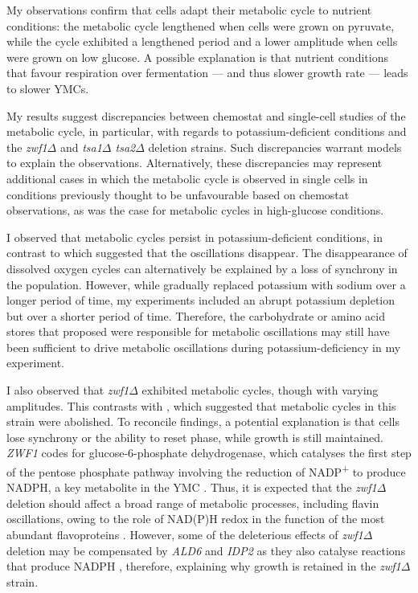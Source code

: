 My observations confirm that cells adapt their metabolic cycle to nutrient conditions:
the metabolic cycle lengthened when cells were grown on pyruvate, while the cycle exhibited a lengthened period and a lower amplitude when cells were grown on low glucose.
A possible explanation is that nutrient conditions that favour respiration over fermentation --- and thus slower growth rate --- leads to slower YMCs.

My results suggest discrepancies between chemostat and single-cell studies of the metabolic cycle, in particular, with regards to potassium-deficient conditions and the \textit{zwf1$\Delta$} and \textit{tsa1$\Delta$ tsa2$\Delta$} deletion strains.
Such discrepancies warrant models to explain the observations.
Alternatively, these discrepancies may represent additional cases in which the metabolic cycle is observed in single cells in conditions previously thought to be unfavourable based on chemostat observations, as was the case for metabolic cycles in high-glucose conditions.

I observed that metabolic cycles persist in potassium-deficient conditions, in contrast to \textcite{oneillEukaryoticCellBiology2020} which suggested that the oscillations disappear.
The disappearance of dissolved oxygen cycles can alternatively be explained by a loss of synchrony in the population.
However, while \textcite{oneillEukaryoticCellBiology2020} gradually replaced potassium with sodium over a longer period of time, my experiments included an abrupt potassium depletion but over a shorter period of time.
Therefore, the carbohydrate or amino acid stores that \textcite{oneillEukaryoticCellBiology2020} proposed were responsible for metabolic oscillations may still have been sufficient to drive metabolic oscillations during potassium-deficiency in my experiment.

I also observed that \textit{zwf1$\Delta$} exhibited metabolic cycles, though with varying amplitudes.
This contrasts with \textcite{tuCyclicChangesMetabolic2007}, which suggested that metabolic cycles in this strain were abolished.
To reconcile findings, a potential explanation is that cells lose synchrony or the ability to reset phase, while growth is still maintained.
\textit{ZWF1} codes for glucose-6-phosphate dehydrogenase, which catalyses the first step of the pentose phosphate pathway involving the reduction of NADP\textsuperscript{+} to produce NADPH, a key metabolite in the YMC \parencite{nogaeIsolationCharacterizationZWF11990}.
Thus, it is expected that the \textit{zwf1$\Delta$} deletion should affect a broad range of metabolic processes, including flavin oscillations, owing to the role of NAD(P)H redox in the function of the most abundant flavoproteins \parencite{gudipatiFlavoproteomeYeastSaccharomyces2014}.
However, some of the deleterious effects of \textit{zwf1$\Delta$} deletion may be compensated by \textit{ALD6} and \textit{IDP2} as they also catalyse reactions that produce NADPH \parencite{minardSourcesNADPHYeast2005}, therefore, explaining why growth is retained in the \textit{zwf1$\Delta$} strain.

